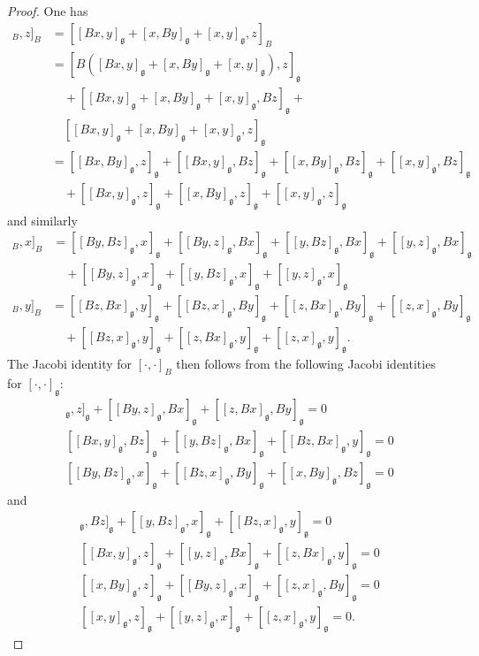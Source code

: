 \documentclass[a4paper,12pt,reqno]{amsart}%
\theoremstyle{definition}
\theoremstyle{remark}
\numberwithin{theorem}{section}
\numberwithin{equation}{section}
\newcommand{\1}{{\bf 1}}
\newcommand{\g}{{\mathfrak g}}
\begin{document}
\begin{proof}
    One has
    \begin{align*}
    [[x, y]_B, z]_B & = [[Bx, y]_\g + [x, By]_\g + [x,y]_\g, z]_B\\
    & = [B \left([Bx, y]_\g + [x, By]_\g + [x,y]_\g\right), z]_\g\\ & \quad+ [[Bx, y]_\g + [x, By]_\g + [x,y]_\g, Bz]_\g + \\&\quad[[Bx, y]_\g + [x, By]_\g + [x,y]_\g, z]_\g
    \\
    & = [[Bx, By]_\g, z]_\g  + [[Bx, y]_\g, Bz]_\g + [[x, By]_\g, Bz]_\g + [[x,y]_\g, Bz]_\g  \\&\quad+[[Bx, y]_\g, z]_\g + [[x, By]_\g, z]_\g + [[x,y]_\g, z]_\g
    \end{align*}
    and similarly
    \begin{align*}
    [[y, z]_B, x]_B & = [[By, Bz]_\g, x]_\g  + [[By, z]_\g, Bx]_\g + [[y, Bz]_\g, Bx]_\g + [[y,z]_\g, Bx]_\g  \\&\quad+[[By, z]_\g, x]_\g + [[y, Bz]_\g, x]_\g + [[y,z]_\g, x]_\g
      \end{align*}
      \begin{align*}
    [[z, x]_B, y]_B & = [[Bz, Bx]_\g, y]_\g  + [[Bz, x]_\g, By]_\g + [[z, Bx]_\g, By]_\g + [[z,x]_\g, By]_\g  \\&\quad+[[Bz, x]_\g, y]_\g + [[z, Bx]_\g, y]_\g + [[z,x]_\g, y]_\g.
      \end{align*}
      The Jacobi identity for $[\cdot, \cdot]_B$ then follows from the following Jacobi identities for $[\cdot,\cdot]_\g$:
      \begin{align*}
          [[Bx, By]_\g, z]_\g  + [[By, z]_\g, Bx]_\g + [[z, Bx]_\g, By]_\g = 0\\
           [[Bx, y]_\g, Bz]_\g + [[y, Bz]_\g, Bx]_\g + [[Bz, Bx]_\g, y]_\g = 0\\
          [[By, Bz]_\g, x]_\g  + [[Bz, x]_\g, By]_\g + [[x, By]_\g, Bz]_\g  = 0
      \end{align*}
      and 
      \begin{align*}
           [[x,y]_\g, Bz]_\g + [[y, Bz]_\g, x]_\g + [[Bz, x]_\g, y]_\g  = 0\\
           [[Bx, y]_\g, z]_\g + [[y,z]_\g, Bx]_\g + [[z, Bx]_\g, y]_\g  = 0\\
           [[x, By]_\g, z]_\g + [[By, z]_\g, x]_\g + [[z,x]_\g, By]_\g = 0\\
           [[x,y]_\g, z]_\g + [[y,z]_\g, x]_\g+ [[z,x]_\g, y]_\g = 0.         
      \end{align*}
\end{proof}
\end{document}
